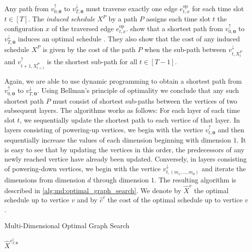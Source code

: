 Any path from $v_{0,\mathbf{0}}^{\uparrow}$ to $v_{T,\mathbf{0}}^{\downarrow}$ must traverse exactly one edge $e_{t,x}^{\text{op}}$ for each time slot $t \in [T]$. The \emph{induced schedule} $X^P$ by a path $P$ assigns each time slot $t$ the configuration $x$ of the traversed edge $e_{t,x}^{\text{op}}$. \citeauthor*{Albers2021_2} show that a shortest path from $v_{0,\mathbf{0}}^{\uparrow}$ to $v_{T,\mathbf{0}}^{\downarrow}$ induces an optimal schedule \cite{Albers2021_2}. They also show that the cost of any induced schedule $X^P$ is given by the cost of the path $P$ when the sub-path between $v_{t,X_t^P}^{\downarrow}$ and $v_{t+1,X_{t+1}^P}^{\uparrow}$ is the shortest sub-path for all $t \in [T-1]$.

Again, we are able to use dynamic programming to obtain a shortest path from $v_{0,\mathbf{0}}^{\uparrow}$ to $v_{T,\mathbf{0}}^{\downarrow}$. Using Bellman's principle of optimality we conclude that any such shortest path $P$ must consist of shortest sub-paths between the vertices of two subsequent layers. The algorithms works as follows: For each layer of each time slot $t$, we sequentially update the shortest path to each vertice of that layer. In layers consisting of powering-up vertices, we begin with the vertice $v_{t,\mathbf{0}}^{\uparrow}$ and then sequentially increase the values of each dimension beginning with dimension $1$. It is easy to see that by updating the vertices in this order, the predecessors of any newly reached vertice have already been updated. Conversely, in layers consisting of powering-down vertices, we begin with the vertice $v_{t,(m_1,\dots,m_d)}^{\downarrow}$ and iterate the dimensions from dimension $d$ through dimension $1$. The resulting algorithm is described in \autoref{alg:md:optimal_graph_search}. We denote by $\hat{X}^v$ the optimal schedule up to vertice $v$ and by $\hat{c}^v$ the cost of the optimal schedule up to vertice $v$.

\begin{algorithm}
    \caption{Multi-Dimensional Optimal Graph Search \cite{Albers2021_2}}\label{alg:md:optimal_graph_search}
    \Return $\hat{X}^{v_{T,\mathbf{0}}^{\downarrow}}$\;
\end{algorithm}

